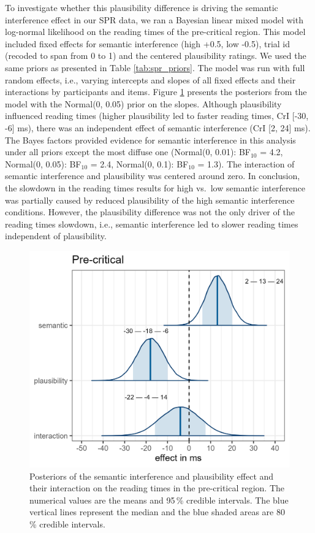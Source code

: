 \documentclass[review,preprint,12pt,authoryear,floatsintext]{elsarticle}
\begin{document}
{To investigate whether this plausibility difference is driving the semantic interference effect in our SPR data, we ran a Bayesian linear mixed model with log-normal likelihood on the reading times of the pre-critical region. This model included fixed effects for semantic interference (high +0.5, low -0.5), trial id (recoded to span from 0 to 1) and the centered plausibility ratings. We used the same priors as presented in Table \ref{tab:spr_priors}. The model was run with full random effects, i.e., varying intercepts and slopes of all fixed effects and their interactions by participants and items. Figure \ref{fig:posteriors_plausibility} presents the posteriors from the model with the Normal(0, 0.05) prior on the slopes. Although plausibility influenced reading times (higher plausibility led to faster reading times, CrI [-30, -6] ms), there was an independent effect of semantic interference (CrI [2, 24] ms). The Bayes factors provided evidence for semantic interference in this analysis under all priors except the most diffuse one (Normal(0, 0.01): BF$_{10}$ = 4.2,
Normal(0, 0.05): BF$_{10}$ = 2.4,
Normal(0, 0.1): BF$_{10}$ = 1.3). The interaction of semantic interference and plausibility was centered around zero. In conclusion, the slowdown in the reading times results for high vs.\ low semantic interference was partially caused by reduced plausibility of the high semantic interference conditions. However, the plausibility difference was not the only driver of the reading times slowdown, i.e., semantic interference led to slower reading times independent of plausibility.

\begin{figure}[ht]
    \centering
        \caption{Posteriors of the semantic interference and plausibility effect and their interaction on the reading times in the pre-critical region. The numerical values are the means and 95\,\% credible intervals. The blue vertical lines represent the median and the blue shaded areas are 80\,\% credible intervals.}\label{fig:posteriors_plausibility}
    \includegraphics[width=0.8\linewidth]{posteriors_spr_pooled_774_plausibility.png}
\end{figure}
}
\end{document}
